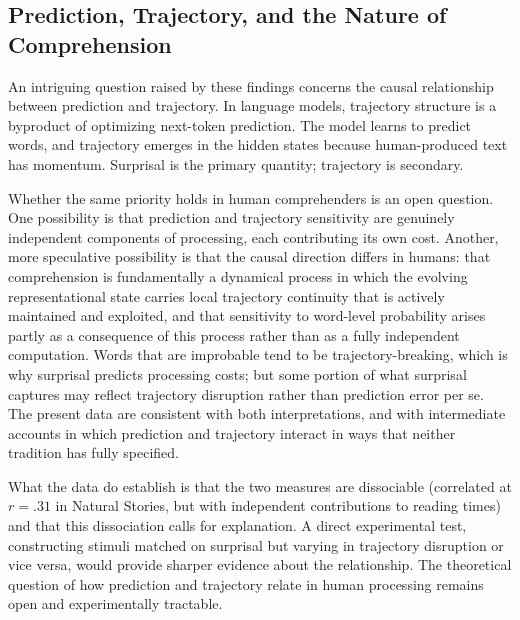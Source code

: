 \documentclass[12pt]{article}
\newcommand{\new}[1]{#1}   %
\begin{document}
\subsection{Prediction, Trajectory, and the Nature of Comprehension}

An intriguing question raised by these findings concerns the causal relationship between prediction and trajectory. In language models, trajectory structure is a byproduct of optimizing next-token prediction. The model learns to predict words, and trajectory emerges in the hidden states because human-produced text has momentum. Surprisal is the primary quantity; trajectory is secondary.

Whether the same priority holds in human comprehenders is an open question. One possibility is that prediction and trajectory sensitivity are genuinely independent components of processing, each contributing its own cost. Another, more speculative possibility is that the causal direction differs in humans: that comprehension is fundamentally a dynamical process in which the evolving representational state carries local trajectory continuity that is actively maintained and exploited, and that sensitivity to word-level probability arises partly as a consequence of this process rather than as a fully independent computation. Words that are improbable tend to be trajectory-breaking, which is why surprisal predicts processing costs; but some portion of what surprisal captures may reflect trajectory disruption rather than prediction error per se. The present data are consistent with both interpretations, and with intermediate accounts in which prediction and trajectory interact in ways that neither tradition has fully specified.

What the data do establish is that the two measures are dissociable \new{(correlated at $r = .31$ in Natural Stories, but with independent contributions to reading times)} and that this dissociation calls for explanation. A direct experimental test, constructing stimuli matched on surprisal but varying in trajectory disruption or vice versa, would provide sharper evidence about the relationship. The theoretical question of how prediction and trajectory relate in human processing remains open and experimentally tractable.
\end{document}
